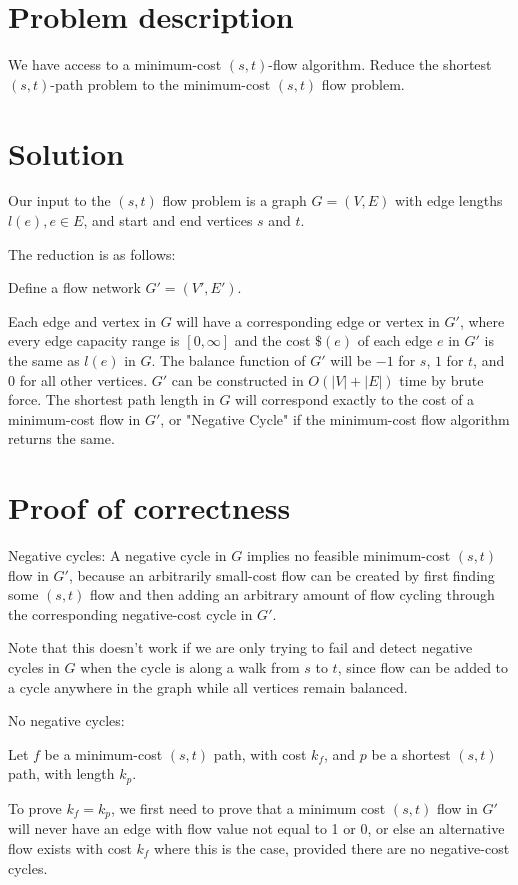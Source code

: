 \documentclass{article}
\begin{document}
\section{Problem description}

We have access to a minimum-cost $(s,t)$-flow algorithm. Reduce the shortest
$(s,t)$-path problem to the minimum-cost $(s,t)$ flow problem.

\section{Solution}

Our input to the $(s,t)$ flow problem is a graph $G = (V,E)$ with edge
lengths $l(e), e \in E$, and start and end vertices $s$ and $t$.

The reduction is as follows:

Define a flow network $G' = (V', E')$. 

Each edge and vertex in $G$ will have a corresponding edge or vertex in $G'$, where
every edge capacity range is $[0, \infty]$ and the cost $\$(e)$ of each edge $e$ in
$G'$ is the same as $l(e)$ in $G$. The balance function of $G'$ will be $-1$ for
$s$, $1$ for $t$, and 0 for all other vertices. $G'$ can be constructed in
$O(|V| + |E|)$ time by brute force. The shortest path length in
$G$ will correspond exactly to the cost of a minimum-cost flow in $G'$, or "Negative
Cycle" if the minimum-cost flow algorithm returns the same.

\section{Proof of correctness}

Negative cycles: A negative cycle in $G$ implies no feasible minimum-cost
$(s,t)$ flow in $G'$, because an arbitrarily small-cost flow can be created by
first finding some $(s,t)$ flow and then adding an arbitrary amount of flow
cycling through the corresponding negative-cost cycle in $G'$.

Note that this doesn't work if we are only trying to fail and detect negative
cycles in $G$ when the cycle is along a walk from $s$ to $t$, since flow can
be added to a cycle anywhere in the graph while all vertices remain balanced.

No negative cycles:

Let $f$ be a minimum-cost $(s,t)$ path, with cost $k_f$, and
$p$ be a shortest $(s,t)$ path, with length $k_p$.

To prove $k_f = k_p$, we first need to prove that a minimum cost $(s,t)$ flow
in $G'$ will never have an edge with flow value not equal to 1 or 0, or else
an alternative flow exists with cost $k_f$ where this is the case, provided there
are no negative-cost cycles.
\end{document}
